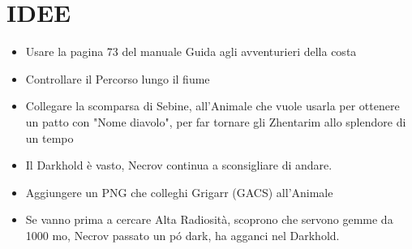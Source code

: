 \documentclass{article}
\begin{document}
        \section{IDEE}
            \begin{itemize}
                \item Usare la pagina 73 del manuale Guida agli avventurieri della costa
                \item Controllare il Percorso lungo il fiume
                \item Collegare la scomparsa di Sebine,  all'Animale che vuole usarla per ottenere un patto con "Nome diavolo", per far tornare  gli Zhentarim allo splendore di un tempo
                \item Il Darkhold è vasto, Necrov continua a sconsigliare di andare.
                \item Aggiungere un PNG che colleghi Grigarr (GACS) all'Animale
                \item Se vanno prima a cercare Alta Radiosità, scoprono che servono gemme da 1000 mo, Necrov passato un pó dark, ha agganci nel Darkhold.  
            \end{itemize}
\end{document}
